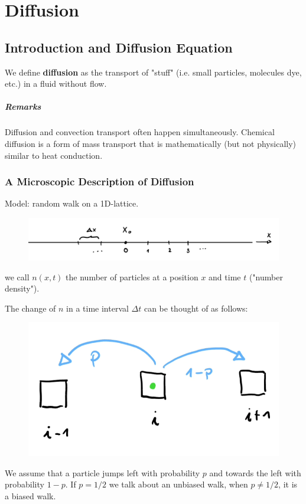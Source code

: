 \setcounter{chapter}{3}
\renewcommand{\thechapter}{D}
\chapter{Diffusion}


\section{Introduction and Diffusion Equation}
We define \textbf{diffusion} as the transport of "stuff" (i.e. small particles, molecules dye, etc.) in a fluid without flow.

\paragraph{Remarks} Diffusion and convection transport often happen simultaneously. Chemical diffusion is a form of mass transport that is mathematically (but not physically) similar to heat conduction.

\subsection{A Microscopic Description of Diffusion}
Model: random walk on a 1D-lattice.
\begin{figure}[H]
	\centering
	\includegraphics[width=0.7\linewidth]{Sketches/RandomWalk}
	\label{fig:randomwalk}
\end{figure}
we call $n(x,t)$ the number of particles at a position $x$ and time $t$ ("number density").

The change of $n$ in a time interval $\Delta t$ can be thought of as follows:

\begin{figure}[H]
	\centering
	\includegraphics[width=0.3\linewidth]{Sketches/RandomWalkJumps}
	\caption{}
	\label{fig:randomwalkjumps}
\end{figure}

We assume that a particle jumps left with probability $p$ and towards the left with probability $1-p$. If $p=1/2$ we talk about an unbiased walk, when $p\ne 1/2$, it is a biased walk.

